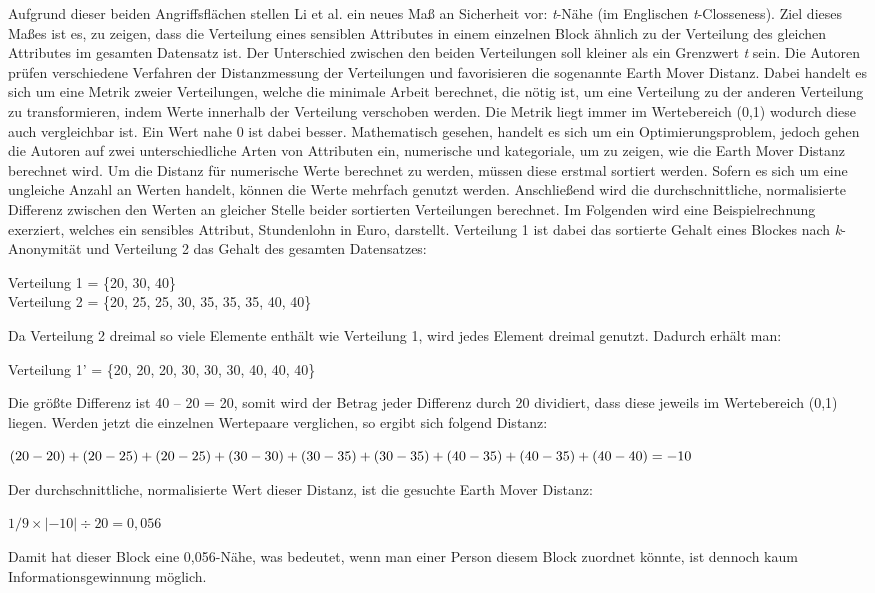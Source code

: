 Aufgrund dieser beiden Angriffsflächen stellen Li et al. \cite{P-25} ein neues Maß an Sicherheit vor: \textit{t}-Nähe (im Englischen \textit{t}-Closseness).
Ziel dieses Maßes ist es, zu zeigen, dass die Verteilung eines sensiblen Attributes in einem einzelnen Block ähnlich zu der Verteilung des gleichen Attributes im gesamten Datensatz ist.
Der Unterschied zwischen den beiden Verteilungen soll kleiner als ein Grenzwert \textit{t} sein.
Die Autoren prüfen verschiedene Verfahren der Distanzmessung der Verteilungen und favorisieren die sogenannte Earth Mover Distanz.
Dabei handelt es sich um eine Metrik zweier Verteilungen, welche die minimale Arbeit berechnet, die nötig ist, um eine Verteilung zu der anderen Verteilung zu transformieren, indem Werte innerhalb der Verteilung verschoben werden. 
Die Metrik liegt immer im Wertebereich (0,1) wodurch diese auch vergleichbar ist. 
Ein Wert nahe 0 ist dabei besser.
Mathematisch gesehen, handelt es sich um ein Optimierungsproblem, jedoch gehen die Autoren auf zwei unterschiedliche Arten von Attributen ein, numerische und kategoriale, um zu zeigen, wie die Earth Mover Distanz berechnet wird.
Um die Distanz für numerische Werte berechnet zu werden, müssen diese erstmal sortiert werden. 
Sofern es sich um eine ungleiche Anzahl an Werten handelt, können die Werte mehrfach genutzt werden.
Anschließend wird die durchschnittliche, normalisierte Differenz zwischen den Werten an gleicher Stelle beider sortierten Verteilungen berechnet.
Im Folgenden wird eine Beispielrechnung exerziert, welches ein sensibles Attribut, Stundenlohn in Euro, darstellt. 
Verteilung 1 ist dabei das sortierte Gehalt eines Blockes nach \textit{k}-Anonymität und Verteilung 2 das Gehalt des gesamten Datensatzes:
\begin{addmargin}[25pt]{0pt} Verteilung 1 = \{20, 30, 40\} \\
Verteilung 2 = \{20, 25, 25, 30, 35, 35, 35, 40, 40\} \end{addmargin}
Da Verteilung 2 dreimal so viele Elemente enthält wie Verteilung 1, wird jedes Element dreimal genutzt. 
Dadurch erhält man:
\begin{addmargin}[25pt]{0pt}Verteilung 1' = \{20, 20, 20, 30, 30, 30, 40, 40, 40\} \end{addmargin}
Die größte Differenz ist 40 – 20 = 20, somit wird der Betrag jeder Differenz durch 20 dividiert, dass diese jeweils im Wertebereich (0,1) liegen.
Werden jetzt die einzelnen Wertepaare verglichen, so ergibt sich folgend Distanz:
\begin{addmargin}[25pt]{0pt}
$ (20-20)+(20-25)+(20-25)+(30-30)+(30-35)+(30-35)+(40-35)+\\ (40-35) + (40-40) = -10$
\end{addmargin}
Der durchschnittliche, normalisierte Wert dieser Distanz, ist die gesuchte Earth Mover Distanz:
\begin{addmargin}[25pt]{0pt}
$ 1/9 \times  |-10| \div 20 = 0,056$
\end{addmargin}
Damit hat dieser Block eine 0,056-Nähe, was bedeutet, wenn man einer Person diesem Block zuordnet könnte, ist dennoch kaum Informationsgewinnung möglich.



